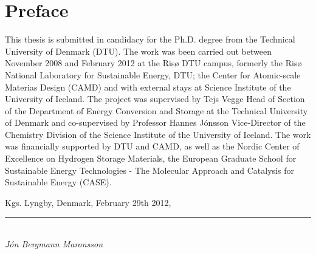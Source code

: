 \section*{Preface}

This thesis is submitted in candidacy for the Ph.D. degree from the Technical University of Denmark (DTU).
The work was been carried out between November 2008 and February 2012 at the Ris\o{} DTU campus, formerly the Ris\o{} National Laboratory for Sustainable Energy, DTU; the Center for Atomic-scale Materias Design (CAMD) and with external stays at Science Institute of the University of Iceland.
The project was supervised by Tejs Vegge Head of Section of the Department of Energy Conversion and Storage at the Technical University of Denmark and co-supervised by Professor Hannes J\'onsson Vice-Director of the Chemistry Division of the Science Institute of the University of Iceland.
The work was financially supported by DTU and CAMD, as well as the Nordic Center of Excellence on Hydrogen Storage Materials, the European Graduate School for Sustainable Energy Technologies - The Molecular Approach and Catalysis for Sustainable Energy (CASE).

\placeholder
\begin{comment}
At the end of my Ph.D. project, I would like to express my thanks many people.

First of all are my supervisors, Tejs Vegge and Hannes J\'onsson.
Tejs' ever positive attitude, always seeing the positive side in all situations served as an incredible inspiration to me both with regards to the project and life in general.
Every meeting of ours would leave me in a better place.
Hannes' involvement was essential to the project.
He is such a fountain of knowledge with regards to all aspects of my project.
I enjoyed our discussion of the sciences tremendously.

Then come my co-workers at DTU and Ris\o{} who are literally too many to appropriately thank each one.
The memers of Tejs Vegge's group who have come and gone.
My office buddies at DTU.

My trusty team of proofreaders and fellow group members warrant special thanks: Jakob Howalt, Steen Lysgaard, J\'on Steinar Gar\dh{}arsson M\'yrdal and Peter Jensen. Cake will be served.

Special thanks go to my lunch buddy and right-hand man Elvar \"Orn J\'onsson and his posse of Icelanders.

My friends, parents, grandparents and seemingly endless amount of siblings have a special place in my heart for tolerating long bouts of my stays abroad.

And finally my main buddy in chemistry (studies and that of the heart), Ester, I love you!
\end{comment}

\vspace{10mm}
\begin{flushright}
Kgs. Lyngby, Denmark, February 29th 2012,\\

\vspace{15mm}

\rule{50mm}{0.1pt}\\
\textit{J\'on Bergmann Maronsson}
\end{flushright}
